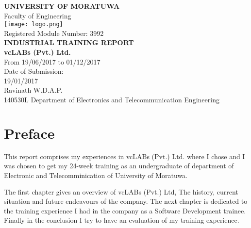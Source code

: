 \documentclass[12pt]{report}
\begin{document}

\begin{titlepage}
    \begin{center}
    	\Large
        \vspace{1cm}
        \textbf{UNIVERSITY OF MORATUWA}\\
        Faculty of Engineering\\
        \vspace{.5cm}
        \texttt{[image: logo.png]}\\
        \vspace{0.5cm}
        Registered Module Number: 3992\\
        \vspace{1cm}
        \textbf{INDUSTRIAL TRAINING REPORT}\\
        \vspace{1cm}
        \textbf{vcLABs (Pvt.) Ltd.}\\
        \vspace{1cm}
        From 19/06/2017 to 01/12/2017\\
        \vspace{.5cm}
        Date of Submission:\\
        19/01/2017\\
        \vspace{.5cm}
        Ravinath W.D.A.P.\\
        140530L Department of Electronics and Telecommunication Engineering
    \end{center}
    \afterpage{\restorepagecolor}
\end{titlepage}

\renewcommand{\thepage}{\roman{page}}

\chapter*{Preface}

This report comprises my experiences in vcLABs (Pvt.) Ltd. where I chose and I was chosen to get my 24-week training as an undergraduate of department of Electronic and Telecomminication of University of Moratuwa.

The first chapter gives an overview of vcLABs (Pvt.) Ltd, The history, current situation and future endeavours of the company. The next chapter is dedicated to the training experience I had in the company as a Software Development trainee. Finally in the conclusion I try to have an evaluation of my training experience.
\end{document}
